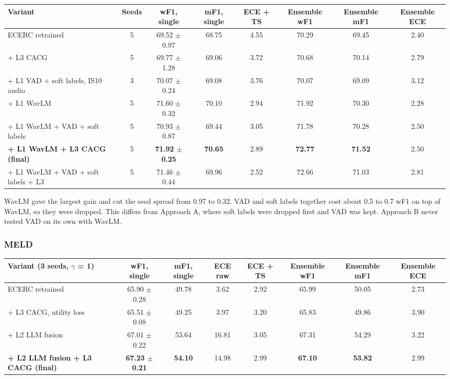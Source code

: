 \documentclass[11pt,a4paper]{article}
\begin{document}
\begin{center}
\begin{adjustbox}{max width=\linewidth}
\begin{tabular}{lccccccc}
\toprule
Variant & Seeds & wF1, single & mF1, single & ECE + TS & Ensemble wF1 & Ensemble mF1 & Ensemble ECE \\
\midrule
ECERC retrained & 5 & 69.52 $\pm$ 0.97 & 68.75 & 4.55 & 70.29 & 69.45 & 2.40 \\
+ L3 CACG & 5 & 69.77 $\pm$ 1.28 & 69.06 & 3.72 & 70.68 & 70.14 & 2.79 \\
+ L1 VAD + soft labels, IS10 audio & 3 & 70.07 $\pm$ 0.24 & 69.08 & 3.76 & 70.07 & 69.09 & 3.12 \\
+ L1 WavLM & 5 & 71.60 $\pm$ 0.32 & 70.10 & 2.94 & 71.92 & 70.30 & 2.28 \\
+ L1 WavLM + VAD + soft labels & 5 & 70.93 $\pm$ 0.87 & 69.44 & 3.05 & 71.78 & 70.28 & 2.50 \\
\textbf{+ L1 WavLM + L3 CACG (final)} & 5 & \textbf{71.92 $\pm$ 0.25} & \textbf{70.65} & 2.89 & \textbf{72.77} & \textbf{71.52} & 2.50 \\
+ L1 WavLM + VAD + soft labels + L3 & 5 & 71.46 $\pm$ 0.44 & 69.96 & 2.52 & 72.66 & 71.03 & 2.81 \\
\bottomrule
\end{tabular}
\end{adjustbox}
\end{center}

WavLM gave the largest gain and cut the seed spread from 0.97 to 0.32. VAD and soft labels together cost about 0.5 to 0.7 wF1 on top of WavLM, so they were dropped. This differs from Approach A, where soft labels were dropped first and VAD was kept. Approach B never tested VAD on its own with WavLM.

\subsubsection{MELD}

\begin{center}
\begin{adjustbox}{max width=\linewidth}
\begin{tabular}{lccccccc}
\toprule
Variant (3 seeds, $\gamma$ = 1) & wF1, single & mF1, single & ECE raw & ECE + TS & Ensemble wF1 & Ensemble mF1 & Ensemble ECE \\
\midrule
ECERC retrained & 65.90 $\pm$ 0.28 & 49.78 & 3.62 & 2.92 & 65.99 & 50.05 & 2.73 \\
+ L3 CACG, utility loss & 65.51 $\pm$ 0.08 & 49.25 & 3.97 & 3.20 & 65.83 & 49.86 & 3.90 \\
+ L2 LLM fusion & 67.01 $\pm$ 0.22 & 53.64 & 16.81 & 3.05 & 67.31 & 54.29 & 3.22 \\
\textbf{+ L2 LLM fusion + L3 CACG (final)} & \textbf{67.23 $\pm$ 0.21} & \textbf{54.10} & 14.98 & 2.99 & \textbf{67.10} & \textbf{53.82} & 2.99 \\
\bottomrule
\end{tabular}
\end{adjustbox}
\end{center}
\end{document}
